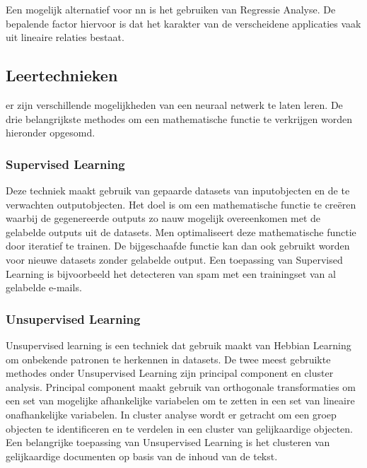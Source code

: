 	Een mogelijk alternatief voor \gls{nn} is het gebruiken van Regressie Analyse. De bepalende factor hiervoor is dat het karakter van de verscheidene applicaties vaak uit lineaire relaties bestaat. 
		
		
		
		
\newpage
\subsection{Leertechnieken}
er zijn verschillende mogelijkheden van een neuraal netwerk te laten leren. De drie belangrijkste methodes om een mathematische functie te verkrijgen worden hieronder opgesomd.


	\subsubsection{Supervised Learning} Deze techniek maakt gebruik van gepaarde datasets van inputobjecten en de te verwachten outputobjecten. Het doel is om een mathematische functie te cre\"eren waarbij de gegenereerde outputs zo nauw mogelijk overeenkomen met de gelabelde outputs uit de datasets. Men optimaliseert deze mathematische functie door iteratief te trainen. De bijgeschaafde functie kan dan ook gebruikt worden voor nieuwe datasets zonder gelabelde output. Een toepassing van Supervised Learning is bijvoorbeeld het detecteren van spam met een trainingset van al gelabelde e-mails.
	
	\subsubsection{Unsupervised Learning} Unsupervised learning is een techniek dat gebruik maakt van Hebbian Learning om onbekende patronen te herkennen in datasets. De twee meest gebruikte methodes onder Unsupervised Learning zijn principal component en cluster analysis. Principal component maakt gebruik van orthogonale transformaties om een set van mogelijke afhankelijke variabelen om te zetten in een set van lineaire onafhankelijke variabelen. In cluster analyse wordt er getracht om een groep objecten te identificeren en te verdelen in een cluster van gelijkaardige objecten. 
	Een belangrijke toepassing van Unsupervised Learning is het clusteren van gelijkaardige documenten op basis van de inhoud van de tekst.
	
	
